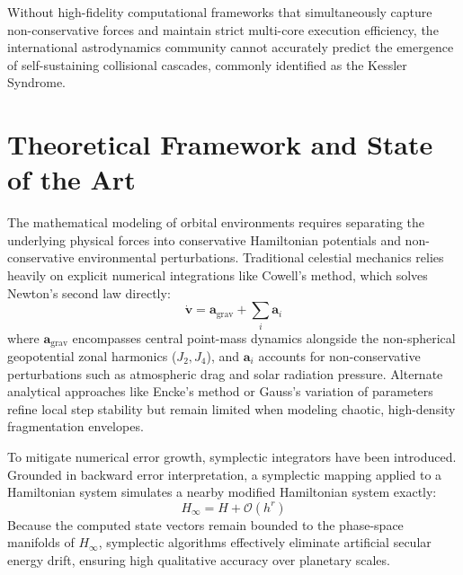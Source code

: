 \documentclass[11pt,letterpaper]{article}
\begin{document}
Without high-fidelity computational frameworks that simultaneously capture non-conservative forces and maintain strict multi-core execution efficiency, the international astrodynamics community cannot accurately predict the emergence of self-sustaining collisional cascades, commonly identified as the Kessler Syndrome.


\section{Theoretical Framework and State of the Art}
The mathematical modeling of orbital environments requires separating the underlying physical forces into conservative Hamiltonian potentials and non-conservative environmental perturbations. Traditional celestial mechanics relies heavily on explicit numerical integrations like Cowell's method, which solves Newton’s second law directly:
\begin{equation}
    \dot{\mathbf{v}} = \mathbf{a}_{\text{grav}} + \sum_{i} \mathbf{a}_{i}
\end{equation}
where $\mathbf{a}_{\text{grav}}$ encompasses central point-mass dynamics alongside the non-spherical geopotential zonal harmonics ($J_2, J_4$), and $\mathbf{a}_{i}$ accounts for non-conservative perturbations such as atmospheric drag and solar radiation pressure. Alternate analytical approaches like Encke's method or Gauss's variation of parameters refine local step stability but remain limited when modeling chaotic, high-density fragmentation envelopes.

To mitigate numerical error growth, symplectic integrators have been introduced. Grounded in backward error interpretation, a symplectic mapping applied to a Hamiltonian system simulates a nearby modified Hamiltonian system exactly:
\begin{equation}
    H_{\infty} = H + \mathcal{O}(h^r)
\end{equation}
Because the computed state vectors remain bounded to the phase-space manifolds of $H_{\infty}$, symplectic algorithms effectively eliminate artificial secular energy drift, ensuring high qualitative accuracy over planetary scales.
\end{document}
